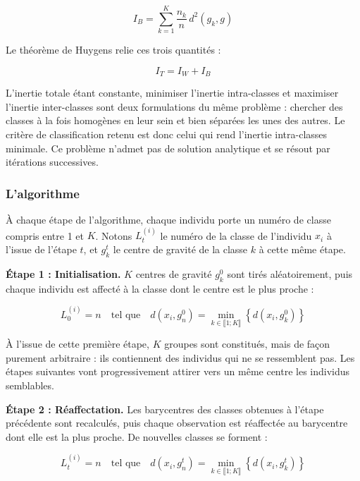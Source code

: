 \begin{equation}
    I_B = \sum_{k=1}^{K} \frac{n_k}{n} \, d^2(g_k, g)
\end{equation}

Le théorème de Huygens relie ces trois quantités :

\begin{equation}
    I_T = I_W + I_B
\end{equation}

L'inertie totale étant constante, minimiser l'inertie intra-classes et maximiser l'inertie inter-classes sont deux formulations du même problème : chercher des classes à la fois homogènes en leur sein et bien séparées les unes des autres. Le critère de classification retenu est donc celui qui rend l'inertie intra-classes minimale. Ce problème n'admet pas de solution analytique et se résout par itérations successives.

\subsubsection*{L'algorithme}

À chaque étape de l'algorithme, chaque individu porte un numéro de classe compris entre 1 et $K$. Notons $L_t^{(i)}$ le numéro de la classe de l'individu $x_i$ à l'issue de l'étape $t$, et $g_k^t$ le centre de gravité de la classe $k$ à cette même étape.

\textbf{Étape 1 : Initialisation.} $K$ centres de gravité $g_k^0$ sont tirés aléatoirement, puis chaque individu est affecté à la classe dont le centre est le plus proche :

\begin{equation}
    L_0^{(i)} = n \quad \text{tel que} \quad d(x_i, g_n^0) = \min_{k \in \llbracket 1 ; K \rrbracket} \left\{ d(x_i, g_k^0) \right\}
\end{equation}

À l'issue de cette première étape, $K$ groupes sont constitués, mais de façon purement arbitraire : ils contiennent des individus qui ne se ressemblent pas. Les étapes suivantes vont progressivement attirer vers un même centre les individus semblables.

\textbf{Étape 2 : Réaffectation.} Les barycentres des classes obtenues à l'étape précédente sont recalculés, puis chaque observation est réaffectée au barycentre dont elle est la plus proche. De nouvelles classes se forment :

\begin{equation}
    L_t^{(i)} = n \quad \text{tel que} \quad d(x_i, g_n^t) = \min_{k \in \llbracket 1 ; K \rrbracket} \left\{ d(x_i, g_k^t) \right\}
\end{equation}

